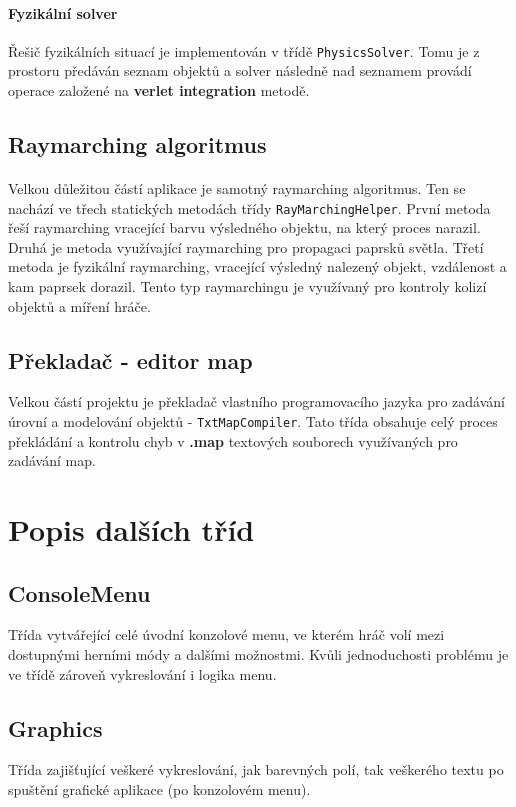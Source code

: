 \documentclass[a4paper, 12pt]{article}
\begin{document}
\paragraph{Fyzikální solver}
Řešič fyzikálních situací je implementován v třídě \texttt{PhysicsSolver}.
Tomu je z prostoru předáván seznam objektů a solver následně nad seznamem
provádí operace založené na \textbf{verlet integration} metodě.

\subsection{Raymarching algoritmus}
\paragraph{} 
Velkou důležitou částí aplikace je samotný raymarching algoritmus. Ten se
nachází ve třech statických metodách třídy \texttt{RayMarchingHelper}. První
metoda řeší raymarching vracející barvu výsledného objektu, na který proces
narazil. Druhá je metoda využívající raymarching pro propagaci paprsků světla.
Třetí metoda je fyzikální raymarching, vracející výsledný nalezený objekt,
vzdálenost a kam paprsek dorazil. Tento typ raymarchingu je využívaný pro
kontroly kolizí objektů a míření hráče.

\subsection{Překladač - editor map}
Velkou částí projektu je překladač vlastního programovacího jazyka pro zadávání
úrovní a modelování objektů - \texttt{TxtMapCompiler}. Tato třída obsahuje celý
proces překládání a kontrolu chyb v \textbf{.map} textových souborech využívaných
pro zadávání map.

\section{Popis dalších tříd}
\subsection{ConsoleMenu}
Třída vytvářející celé úvodní konzolové menu, ve kterém hráč volí mezi
dostupnými herními módy a dalšími možnostmi. Kvůli jednoduchosti problému je ve 
třídě zároveň vykreslování i logika menu.

\subsection{Graphics}
Třída zajišťující veškeré vykreslování, jak barevných polí, tak veškerého textu
po spuštění grafické aplikace (po konzolovém menu).
\end{document}

